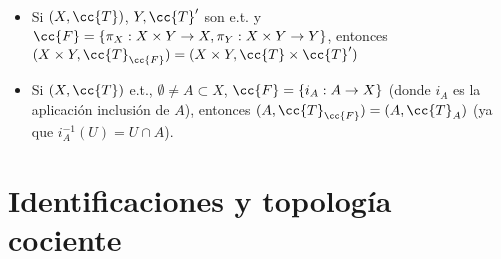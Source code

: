 \begin{ejemplo}\
    \begin{itemize}
        \item Si $(X, \cc{T})$, $Y, \cc{T}'$ son e.t. y $\cc{F}=\{\pi_X: X\times Y \to X, \pi_Y:X\times Y \to Y\}$, entonces $(X\times Y, \cc{T}_{\cc{F}}) = (X\times Y, \cc{T}\times \cc{T}')$
        \item Si $(X, \cc{T})$ e.t., $\emptyset \neq A \subset X$, $\cc{F}=\{i_A: A\to X\}$ (donde $i_A$ es la aplicación inclusión de $A$), entonces $(A, \cc{T}_{\cc{F}})=(A, \cc{T}_A)$ (ya que $i_A^{-1}(U)=U \cap A$).
    \end{itemize}
\end{ejemplo}

\section{Identificaciones y topología cociente}

